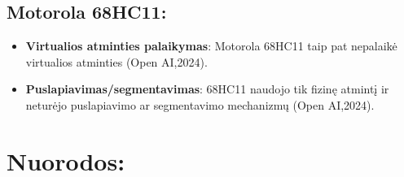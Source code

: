 \documentclass[a4paper,12pt]{article}
\begin{document}
\subsection{Motorola 68HC11:}
\begin{itemize}
    \item \textbf{Virtualios atminties palaikymas}: Motorola 68HC11 taip pat nepalaikė virtualios atminties (Open AI,2024).
    \item \textbf{Puslapiavimas/segmentavimas}: 68HC11 naudojo tik fizinę atmintį ir neturėjo puslapiavimo ar segmentavimo mechanizmų (Open AI,2024).
\end{itemize}

\section{Nuorodos:}
\end{document}
